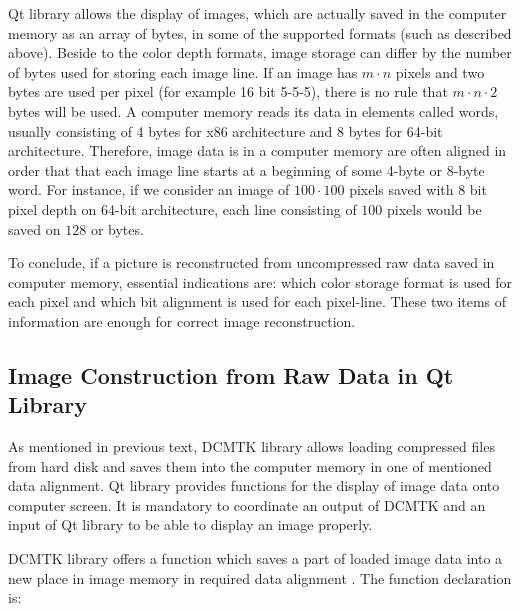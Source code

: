 
Qt library allows the display of images, which are actually saved in the computer memory as an array of bytes, in some of the supported formats (such as described above). Beside to the color depth formats, image storage can differ by the number of bytes used for storing each image line. If an image has $m \cdot n$ pixels and two bytes are used per pixel (for example 16 bit 5-5-5), there is no rule that $m \cdot n \cdot 2$ bytes will be used. A computer memory reads its data in elements called words, usually consisting of 4 bytes for x86 architecture and 8 bytes for 64-bit architecture. Therefore, image data is in a computer memory are often aligned in order that that each image line starts at a beginning of some 4-byte or 8-byte word\cite{memoryalignment}. For instance, if we consider an image of $100 \cdot 100$ pixels saved with 8 bit pixel depth on 64-bit architecture, each line consisting of $100$ pixels would be saved on $128$ or bytes.

To conclude, if a picture is reconstructed from uncompressed raw data saved in computer memory, essential indications are: which color storage format is used for each pixel and which bit alignment is used for each pixel-line. These two items of information are enough for correct image reconstruction.

\subsection{Image Construction from Raw Data in Qt Library}
As mentioned in previous text, DCMTK library allows loading compressed files from hard disk and saves them into the computer memory in one of mentioned data alignment. Qt library provides functions for the display of image data onto computer screen. It is mandatory to coordinate an output of DCMTK and an input of Qt library to be able to display an image properly.

DCMTK library offers a function which saves a part of loaded image data into a new place in image memory in required data alignment \cite{dcmtksupport}. The function declaration is:

